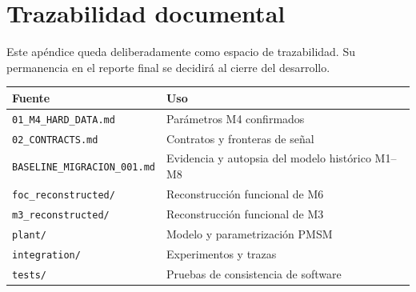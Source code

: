\section{Trazabilidad documental}

Este apéndice queda deliberadamente como espacio de trazabilidad. Su permanencia en el reporte final se decidirá al cierre del desarrollo.

\begin{longtable}{p{}p{}}
\toprule
Fuente & Uso \\
\midrule
\texttt{01\_M4\_HARD\_DATA.md} & Parámetros M4 confirmados \\
\texttt{02\_CONTRACTS.md} & Contratos y fronteras de señal \\
\texttt{BASELINE\_MIGRACION\_001.md} & Evidencia y autopsia del modelo histórico M1--M8 \\
\texttt{foc\_reconstructed/} & Reconstrucción funcional de M6 \\
\texttt{m3\_reconstructed/} & Reconstrucción funcional de M3 \\
\texttt{plant/} & Modelo y parametrización PMSM \\
\texttt{integration/} & Experimentos y trazas \\
\texttt{tests/} & Pruebas de consistencia de software \\
\bottomrule
\end{longtable}
